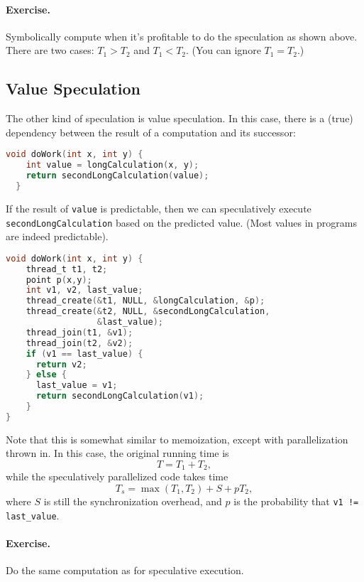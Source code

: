 \paragraph{Exercise.} Symbolically compute when it's profitable to do the
speculation as shown above. There are two cases: $T_1 > T_2$ and $T_1
< T_2$. (You can ignore $T_1 = T_2$.)


\subsection*{Value Speculation}
The other kind of speculation is value speculation. In this case,
there is a (true) dependency between the result of a computation 
and its successor:

{\small \begin{lstlisting}[language=C]
  void doWork(int x, int y) {
    int value = longCalculation(x, y);
    return secondLongCalculation(value);
  }
\end{lstlisting} }
If the result of {\tt value} is predictable, then we can speculatively
execute {\tt secondLongCalculation} based on the predicted value.
(Most values in programs are indeed predictable).
{\small \begin{lstlisting}[language=C]
void doWork(int x, int y) {
    thread_t t1, t2;
    point p(x,y);
    int v1, v2, last_value;
    thread_create(&t1, NULL, &longCalculation, &p);
    thread_create(&t2, NULL, &secondLongCalculation,
                  &last_value);
    thread_join(t1, &v1);
    thread_join(t2, &v2);
    if (v1 == last_value) {
      return v2;
    } else {
      last_value = v1;
      return secondLongCalculation(v1);
    }
}
\end{lstlisting}
}
Note that this is somewhat similar to memoization, except with 
parallelization thrown in. In this case, the original running time is
\[ T = T_1 + T_2, \]
while the speculatively parallelized code takes time
\[ T_s = \max(T_1, T_2) + S + pT_2,\]
where $S$ is still the synchronization overhead, and $p$ is the probability that
\verb+v1 != last_value+.

\paragraph{Exercise.} Do the same computation as for speculative execution.


